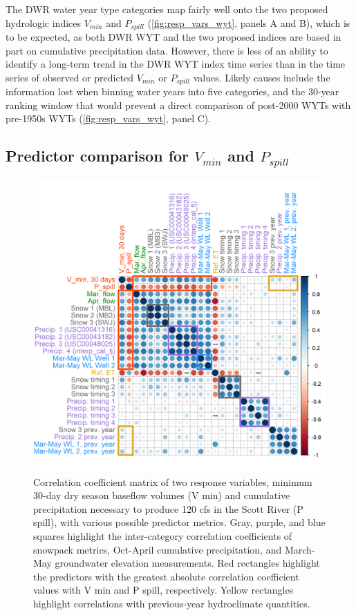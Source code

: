 \documentclass[hess, manuscript]{copernicus}
\begin{document}
The DWR water year type categories map fairly well onto the two proposed
hydrologic indices \(V_{min}\) and \(P_{spill}\)
(\autoref{fig:resp_vars_wyt}, panels A and B), which is to be expected,
as both DWR WYT and the two proposed indices are based in part on
cumulative precipitation data. However, there is less of an ability to
identify a long-term trend in the DWR WYT index time series than in the
time series of observed or predicted \(V_{min}\) or \(P_{spill}\)
values. Likely causes include the information lost when binning water
years into five categories, and the 30-year ranking window that would
prevent a direct comparison of post-2000 WYTs with pre-1950s WYTs
(\autoref{fig:resp_vars_wyt}, panel C).

\subsection{\texorpdfstring{Predictor comparison for \(V_{min}\) and
\(P_{spill}\)}{Predictor comparison for V\_\{min\} and P\_\{spill\}}}

\begin{figure}
\includegraphics[width=1\linewidth]{f08} \caption{\label{fig:corr_matrix} Correlation coefficient matrix of two response variables, minimum 30-day dry season baseflow volumes (V min) and cumulative precipitation necessary to produce 120 cfs in the Scott River (P spill), with various possible predictor metrics. Gray, purple, and blue squares highlight the inter-category correlation coefficients of snowpack metrics, Oct-April cumulative precipitation, and March-May groundwater elevation measurements. Red rectangles highlight the predictors with the greatest absolute correlation coefficient values with V min and P spill, respectively. Yellow rectangles highlight correlations with previous-year hydroclimate quantities.}\label{fig:corr_matrix}
\end{figure}
\end{document}
